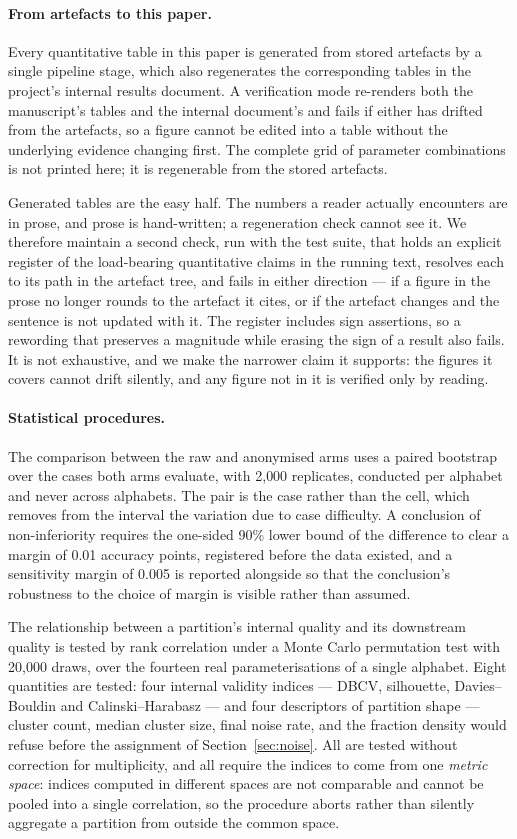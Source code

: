 \paragraph{From artefacts to this paper.}
Every quantitative table in this paper is generated from stored artefacts by a single pipeline
stage, which also regenerates the corresponding tables in the project's internal results
document. A verification mode re-renders both the manuscript's tables and the internal
document's and fails if either has drifted from the artefacts, so a figure cannot be edited into
a table without the underlying evidence changing first. The complete grid of parameter
combinations is not printed here; it is regenerable from the stored artefacts.

Generated tables are the easy half. The numbers a reader actually encounters are in prose, and
prose is hand-written; a regeneration check cannot see it. We therefore maintain a second check,
run with the test suite, that holds an explicit register of the load-bearing quantitative claims
in the running text, resolves each to its path in the artefact tree, and fails in either
direction --- if a figure in the prose no longer rounds to the artefact it cites, or if the
artefact changes and the sentence is not updated with it. The register includes sign assertions,
so a rewording that preserves a magnitude while erasing the sign of a result also fails. It is
not exhaustive, and we make the narrower claim it supports: the figures it covers cannot drift
silently, and any figure not in it is verified only by reading.

\paragraph{Statistical procedures.}
The comparison between the raw and anonymised arms uses a paired bootstrap over the cases both
arms evaluate, with 2{,}000 replicates, conducted per alphabet and never across alphabets. The
pair is the case rather than the cell, which removes from the interval the variation due to case
difficulty. A conclusion of non-inferiority requires the one-sided 90\% lower bound of the
difference to clear a margin of 0.01 accuracy points, registered before the data existed, and a
sensitivity margin of 0.005 is reported alongside so that the conclusion's robustness to the
choice of margin is visible rather than assumed.

The relationship between a partition's internal quality and its downstream quality is tested by
rank correlation under a Monte Carlo permutation test with 20{,}000 draws, over the fourteen real
parameterisations of a single alphabet. Eight quantities are tested: four internal validity
indices --- DBCV, silhouette, Davies--Bouldin and Calinski--Harabasz --- and four descriptors of
partition shape --- cluster count, median cluster size, final noise rate, and the fraction density
would refuse before the assignment of Section~\ref{sec:noise}. All are tested without correction
for multiplicity, and all require the indices to come from one \emph{metric space}: indices
computed in different spaces are not comparable and cannot be pooled into a single correlation, so
the procedure aborts rather than silently aggregate a partition from outside the common space.

